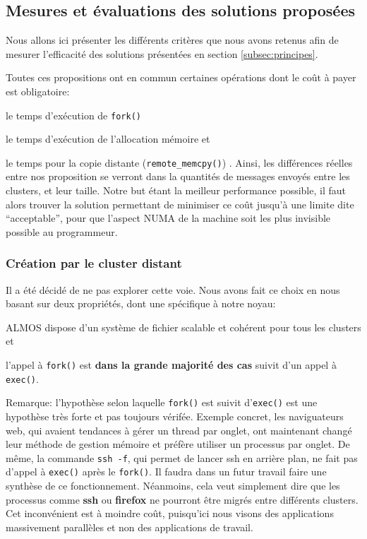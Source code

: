   \subsection{Mesures et évaluations des solutions proposées}
  \label{subsec:eval}

    Nous allons ici présenter les différents critères que nous avons retenus
    afin de mesurer l'efficacité des solutions présentées en section
    \ref{subsec:principes}.

    Toutes ces propositions ont en commun certaines opérations dont le coût à
    payer est obligatoire: \benumline \item le temps d'exécution de
    \texttt{fork()}\item le temps d'exécution de l'allocation mémoire et \item
    le temps pour la copie distante (\texttt{remote\_memcpy()})
    \eenumline. Ainsi, les différences réelles entre nos proposition se verront
    dans la quantités de messages envoyés entre les clusters, et leur
    taille. Notre but étant la meilleur performance possible, il faut alors
    trouver la solution permettant de minimiser ce coût jusqu'à une limite dite
    ``acceptable'', pour que l'aspect NUMA de la machine soit les plus invisible
    possible au programmeur.

    \subsubsection{Création par le cluster distant}
    \label{subsubsec:remote-create}

      Il a été décidé de ne pas explorer cette voie. Nous avons fait ce choix en
      nous basant sur deux propriétés, dont une spécifique à notre noyau:
      \benumline \item ALMOS dispose d'un système de fichier scalable et
      cohérent pour tous les clusters et \item l'appel à \texttt{fork()} est
      \textbf{dans la grande majorité des cas} suivit d'un appel à
      \texttt{exec()}\eenumline.

      \begin{paragraph}{Remarque:}
      \label{par:remarque}
        l'hypothèse selon laquelle \texttt{fork()} est suivit d'\texttt{exec()}
        est une hypothèse très forte et pas toujours vérifée. Exemple concret,
        les naviguateurs web, qui avaient tendances à gérer un thread par
        onglet, ont maintenant changé leur méthode de gestion mémoire et préfère
        utiliser un processus par onglet. De même, la commande \texttt{ssh -f},
        qui permet de lancer ssh en arrière plan, ne fait pas d'appel à
        \texttt{exec()} après le \texttt{fork()}. Il faudra dans un futur
        travail faire une synthèse de ce fonctionnement. Néanmoins, cela veut
        simplement dire que les processus comme \textbf{ssh} ou \textbf{firefox}
        ne pourront être migrés entre différents clusters. Cet inconvénient est
        à moindre coût, puisqu'ici nous visons des applications massivement
        parallèles et non des applications de travail.
      \end{paragraph}

